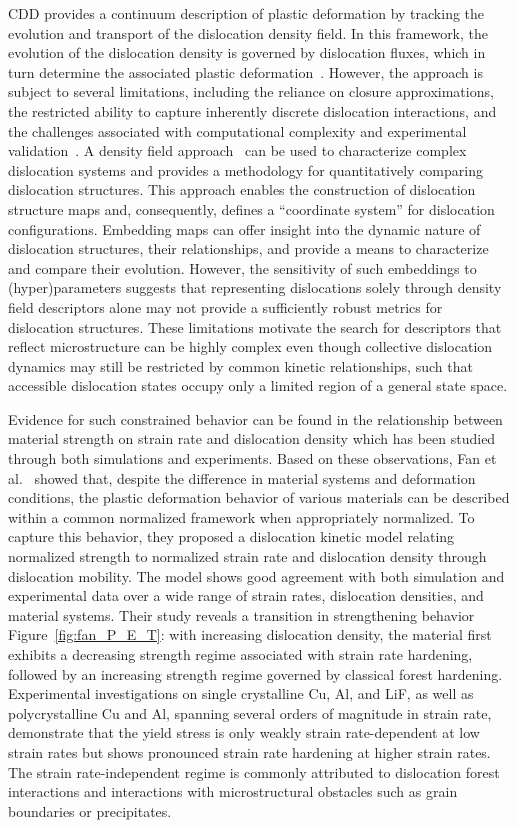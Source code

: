 \documentclass[pdflatex,sn-mathphys-num]{sn-jnl}%
\theoremstyle{thmstyleone}%
\theoremstyle{thmstyletwo}%
\theoremstyle{thmstylethree}%
\begin{document}
CDD provides a continuum description of plastic deformation by tracking the evolution and transport of the dislocation density field. In this framework, the evolution of the dislocation density is governed by dislocation fluxes, which in turn determine the associated plastic deformation~\cite{Ebrahimi2014}.
However, the approach is subject to several limitations, including the reliance on closure approximations, the restricted ability to capture inherently discrete dislocation interactions, and the challenges associated with computational complexity and experimental validation~\cite{SANDFELD2015, HOCHRAINER2016}.
A density field approach~\cite{Udofia2025} can be used to characterize complex dislocation systems and provides a methodology for quantitatively comparing dislocation structures.
This approach enables the construction of dislocation structure maps and, consequently, defines a ``coordinate system'' for dislocation configurations.
Embedding maps can offer insight into the dynamic nature of dislocation structures, their relationships, and provide a means to characterize and compare their evolution.
However, the sensitivity of such embeddings to (hyper)parameters suggests that representing dislocations solely through density field descriptors alone may not provide a sufficiently robust metrics for dislocation structures. These limitations motivate the search for descriptors that reflect microstructure can be highly complex even though collective dislocation dynamics may still be restricted by common kinetic relationships, such that accessible dislocation states occupy only a limited region of a general state space.
 
Evidence for such constrained behavior can be found in the relationship between material strength on strain rate and dislocation density which has been studied through both simulations and experiments. Based on these observations, Fan et al.~\cite{Fan2021} showed that, despite the difference in material systems and deformation conditions, the plastic deformation behavior of various materials can be described within a common normalized framework when appropriately normalized.
To capture this behavior, they proposed a dislocation kinetic model relating normalized strength to normalized strain rate and dislocation density through dislocation mobility.
The model shows good agreement with both simulation and experimental data over a wide range of strain rates, dislocation densities, and material systems.
Their study reveals a transition in strengthening behavior Figure~\ref{fig:fan_P_E_T}: with increasing dislocation density, the material first exhibits a decreasing strength regime associated with strain rate hardening, followed by an increasing strength regime governed by classical forest hardening. Experimental investigations on single crystalline Cu, Al, and LiF, as well as polycrystalline Cu and Al, spanning several orders of magnitude in strain rate, demonstrate that the yield stress is only weakly strain rate-dependent at low strain rates but shows pronounced strain rate hardening at higher strain rates.
The strain rate-independent regime is commonly attributed to dislocation forest interactions and interactions with microstructural obstacles such as grain boundaries or precipitates. 
\end{document}
